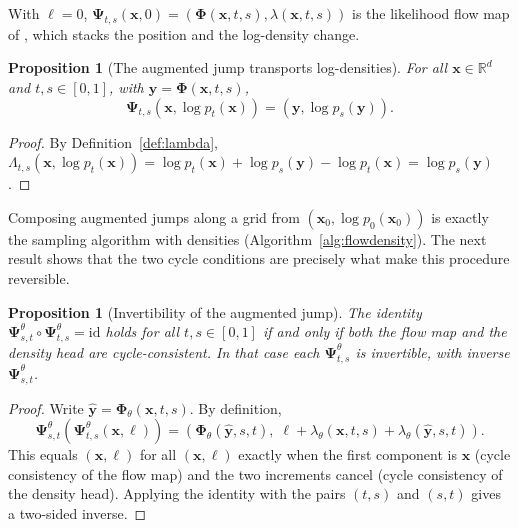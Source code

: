 \documentclass[11pt,a4paper]{article}
\numberwithin{equation}{section}     %
\theoremstyle{plain}        %
\newtheorem{proposition}[theorem]{Proposition}
\theoremstyle{definition}   %
\theoremstyle{remark}       %
\begin{document}
With $\ell=0$, $\boldsymbol{\Psi}_{t,s}(\mathbf{x},0)=(\boldsymbol{\Phi}(\mathbf{x},t,s),\lambda(\mathbf{x},t,s))$ is the likelihood flow map of \citet{ouyang2026}, which stacks the position and the log-density change.

\begin{proposition}[The augmented jump transports log-densities]\label{prop:augtransport}
For all $\mathbf{x}\in\mathbb{R}^d$ and $t,s\in[0,1]$, with $\mathbf{y}=\boldsymbol{\Phi}(\mathbf{x},t,s)$,
\[
\boldsymbol{\Psi}_{t,s}\left(\mathbf{x},\log p_t(\mathbf{x})\right)=\left(\mathbf{y},\log p_s(\mathbf{y})\right).
\]
\end{proposition}

\begin{proof}
By Definition~\ref{def:lambda}, $\Lambda_{t,s}(\mathbf{x},\log p_t(\mathbf{x}))=\log p_t(\mathbf{x})+\log p_s(\mathbf{y})-\log p_t(\mathbf{x})=\log p_s(\mathbf{y})$.
\end{proof}

Composing augmented jumps along a grid from $(\mathbf{x}_0,\log p_0(\mathbf{x}_0))$ is exactly the sampling algorithm with densities (Algorithm~\ref{alg:flowdensity}). The next result shows that the two cycle conditions are precisely what make this procedure reversible.

\begin{proposition}[Invertibility of the augmented jump]\label{prop:augcycle}
The identity $\boldsymbol{\Psi}^\theta_{s,t}\circ\boldsymbol{\Psi}^\theta_{t,s}=\mathrm{id}$ holds for all $t,s\in[0,1]$ if and only if both the flow map and the density head are cycle-consistent. In that case each $\boldsymbol{\Psi}^\theta_{t,s}$ is invertible, with inverse $\boldsymbol{\Psi}^\theta_{s,t}$.
\end{proposition}

\begin{proof}
Write $\hat{\mathbf{y}}=\boldsymbol{\Phi}_\theta(\mathbf{x},t,s)$. By definition,
\[
\boldsymbol{\Psi}^\theta_{s,t}\left(\boldsymbol{\Psi}^\theta_{t,s}(\mathbf{x},\ell)\right)=\left(\boldsymbol{\Phi}_\theta(\hat{\mathbf{y}},s,t),\;\ell+\lambda_\theta(\mathbf{x},t,s)+\lambda_\theta(\hat{\mathbf{y}},s,t)\right).
\]
This equals $(\mathbf{x},\ell)$ for all $(\mathbf{x},\ell)$ exactly when the first component is $\mathbf{x}$ (cycle consistency of the flow map) and the two increments cancel (cycle consistency of the density head). Applying the identity with the pairs $(t,s)$ and $(s,t)$ gives a two-sided inverse.
\end{proof}
\end{document}
